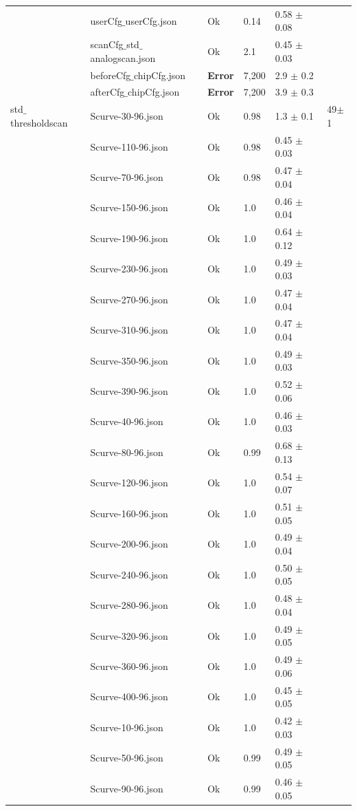 {\begin{longtable}{|llllll|}
 & userCfg$\_$userCfg.json & Ok & 0.14 & 0.58 $\pm$ 0.08 & \\
 & scanCfg$\_$std$\_$analogscan.json & Ok & 2.1 & 0.45 $\pm$ 0.03 & \\
 & beforeCfg$\_$chipCfg.json & { \bf Error} & 7,200 & 2.9 $\pm$ 0.2 & \\
 & afterCfg$\_$chipCfg.json & { \bf Error} & 7,200 & 3.9 $\pm$ 0.3 & \\
\hline
std$\_$thresholdscan & Scurve-30-96.json & Ok & 0.98 & 1.3 $\pm$ 0.1 & 49$\pm$1\\
 & Scurve-110-96.json & Ok & 0.98 & 0.45 $\pm$ 0.03 & \\
 & Scurve-70-96.json & Ok & 0.98 & 0.47 $\pm$ 0.04 & \\
 & Scurve-150-96.json & Ok & 1.0 & 0.46 $\pm$ 0.04 & \\
 & Scurve-190-96.json & Ok & 1.0 & 0.64 $\pm$ 0.12 & \\
 & Scurve-230-96.json & Ok & 1.0 & 0.49 $\pm$ 0.03 & \\
 & Scurve-270-96.json & Ok & 1.0 & 0.47 $\pm$ 0.04 & \\
 & Scurve-310-96.json & Ok & 1.0 & 0.47 $\pm$ 0.04 & \\
 & Scurve-350-96.json & Ok & 1.0 & 0.49 $\pm$ 0.03 & \\
 & Scurve-390-96.json & Ok & 1.0 & 0.52 $\pm$ 0.06 & \\
 & Scurve-40-96.json & Ok & 1.0 & 0.46 $\pm$ 0.03 & \\
 & Scurve-80-96.json & Ok & 0.99 & 0.68 $\pm$ 0.13 & \\
 & Scurve-120-96.json & Ok & 1.0 & 0.54 $\pm$ 0.07 & \\
 & Scurve-160-96.json & Ok & 1.0 & 0.51 $\pm$ 0.05 & \\
 & Scurve-200-96.json & Ok & 1.0 & 0.49 $\pm$ 0.04 & \\
 & Scurve-240-96.json & Ok & 1.0 & 0.50 $\pm$ 0.05 & \\
 & Scurve-280-96.json & Ok & 1.0 & 0.48 $\pm$ 0.04 & \\
 & Scurve-320-96.json & Ok & 1.0 & 0.49 $\pm$ 0.05 & \\
 & Scurve-360-96.json & Ok & 1.0 & 0.49 $\pm$ 0.06 & \\
 & Scurve-400-96.json & Ok & 1.0 & 0.45 $\pm$ 0.05 & \\
 & Scurve-10-96.json & Ok & 1.0 & 0.42 $\pm$ 0.03 & \\
 & Scurve-50-96.json & Ok & 0.99 & 0.49 $\pm$ 0.05 & \\
 & Scurve-90-96.json & Ok & 0.99 & 0.46 $\pm$ 0.05 & \\

\end{longtable}}
